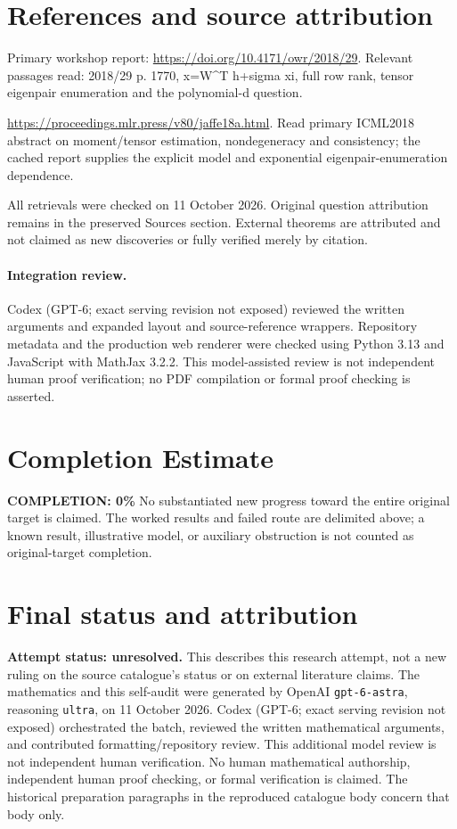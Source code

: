 \documentclass[11pt]{article}
\begin{document}
\section{References and source attribution}
Primary workshop report: \url{https://doi.org/10.4171/owr/2018/29}. Relevant passages read: 2018/29 p. 1770, x=W^T h+sigma xi, full row rank, tensor eigenpair enumeration and the polynomial-d question.

\url{https://proceedings.mlr.press/v80/jaffe18a.html}. Read primary ICML2018 abstract on moment/tensor estimation, nondegeneracy and consistency; the cached report supplies the explicit model and exponential eigenpair-enumeration dependence.

All retrievals were checked on 11 October 2026. Original question attribution remains in the preserved Sources section. External theorems are attributed and not claimed as new discoveries or fully verified merely by citation.


\paragraph{Integration review.} Codex (GPT-6; exact serving revision not exposed) reviewed the written arguments and expanded layout and source-reference wrappers. Repository metadata and the production web renderer were checked using Python 3.13 and JavaScript with MathJax 3.2.2. This model-assisted review is not independent human proof verification; no PDF compilation or formal proof checking is asserted.

\section{Completion Estimate}
\noindent\textbf{COMPLETION: 0\%}
No substantiated new progress toward the entire original target is claimed. The worked results and failed route are delimited above; a known result, illustrative model, or auxiliary obstruction is not counted as original-target completion.

\section{Final status and attribution}
\textbf{Attempt status: unresolved.} This describes this research attempt, not a new ruling on the source catalogue's status or on external literature claims.
The mathematics and this self-audit were generated by OpenAI \texttt{gpt-6-astra}, reasoning \texttt{ultra}, on 11 October 2026. Codex (GPT-6; exact serving revision not exposed) orchestrated the batch, reviewed the written mathematical arguments, and contributed formatting/repository review. This additional model review is not independent human verification. No human mathematical authorship, independent human proof checking, or formal verification is claimed. The historical preparation paragraphs in the reproduced catalogue body concern that body only.
\end{document}
